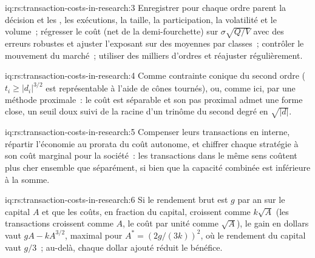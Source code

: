 \begin{solution}{iq:rs:transaction-costs-in-research:3}
Enregistrer pour chaque ordre parent la décision et les , les exécutions, la taille, la participation, la volatilité et le volume~; régresser le coût (net de la demi-fourchette) sur
$\sigma\sqrt{Q/V}$ avec des erreurs robustes et ajuster l'exposant sur des moyennes par classes~; contrôler le mouvement du marché~; utiliser des milliers d'ordres et réajuster régulièrement.
\end{solution}

\begin{solution}{iq:rs:transaction-costs-in-research:4}
Comme contrainte conique du second ordre ($t_i \ge \lvert d_i\rvert^{3/2}$ est représentable à l'aide de cônes tournés), ou, comme ici, par une méthode proximale~: le coût est séparable et
son pas proximal admet une forme close, un seuil doux suivi de la racine d'un trinôme du second degré en $\sqrt{\lvert d\rvert}$.
\end{solution}

\begin{solution}{iq:rs:transaction-costs-in-research:5}
Compenser leurs transactions en interne, répartir l'économie au prorata du coût autonome, et chiffrer chaque stratégie à son coût marginal pour la société~: les transactions dans le même sens coûtent plus cher
ensemble que séparément, si bien que la capacité combinée est inférieure à la somme.
\end{solution}

\begin{solution}{iq:rs:transaction-costs-in-research:6}
Si le rendement brut est $g$ par an sur le capital $A$ et que les coûts, en fraction du capital, croissent comme $k\sqrt A$ (les transactions croissent comme $A$, le coût par unité comme $\sqrt A$), le gain
en dollars vaut $gA - kA^{3/2}$, maximal pour $A^* = (2g/(3k))^2$, où le rendement du capital vaut $g/3$~; au-delà, chaque dollar ajouté réduit le bénéfice.
\end{solution}

